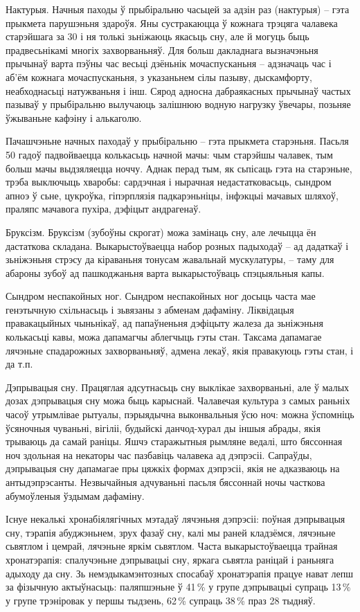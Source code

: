 Нактурыя. Начныя паходы ў прыбіральню часьцей за адзін раз (нактурыя) – гэта прыкмета парушэньня здароўя. Яны сустракаюцца ў кожнага трэцяга чалавека старэйшага за 30 і ня толькі зьніжаюць якасьць сну, але й могуць быць прадвесьнікамі многіх захворваньняў. Для больш дакладнага вызначэньня прычынаў варта пэўны час весьці дзёньнік мочаспусканьня – адзначаць час і аб'ём кожнага мочаспусканьня, з указаньнем сілы пазыву, дыскамфорту, неабходнасьці натужваньня і інш. Сярод адносна дабраякасных прычынаў частых пазываў у прыбіральню вылучаюць залішнюю водную нагрузку ўвечары, позьняе ўжываньне кафэіну і алькаголю.

Пачашчэньне начных паходаў у прыбіральню – гэта прыкмета старэньня. Пасьля 50 гадоў падвойваецца колькасьць начной мачы: чым старэйшы чалавек, тым больш мачы выдзяляецца ноччу. Аднак перад тым, як сьпісаць гэта на старэньне, трэба выключыць хваробы: сардэчная і нырачная недастатковасьць, сындром апноэ ў сьне, цукроўка, гіпэрплязія падкарэньніцы, інфэкцыі мачавых шляхоў, праляпс мачавога пухіра, дэфіцыт андрагенаў.

Бруксізм. Бруксізм (зубоўны скрогат) можа замінаць сну, але лечыцца ён дастаткова складана. Выкарыстоўваецца набор розных падыходаў – ад дадаткаў і зьніжэньня стрэсу да кіраваньня тонусам жавальнай мускулатуры, – таму для абароны зубоў ад пашкоджаньня варта выкарыстоўваць спэцыяльныя капы. 

Сындром неспакойных ног. Сындром неспакойных ног досыць часта мае генэтычную схільнасьць і зьвязаны з абменам дафаміну. Ліквідацыя правакацыйных чыньнікаў, ад папаўненьня дэфіцыту жалеза да зьніжэньня колькасьці кавы, можа дапамагчы аблегчыць гэты стан. Таксама дапамагае лячэньне спадарожных захворваньняў, адмена лекаў, якія правакуюць гэты стан, і да т.п.

Дэпрывацыя сну. Працяглая адсутнасьць сну выклікае захворваньні, але ў малых дозах дэпрывацыя сну можа быць карыснай. Чалавечая культура з самых раньніх часоў утрымлівае рытуалы, пэрыядычна выконвальныя ўсю ноч: можна ўспомніць ўсяночныя чуваньні, вігіліі, будыйскі данчод-хурал ды іншыя абрады, якія трываюць да самай раніцы. Яшчэ старажытныя рымляне ведалі, што бяссонная ноч здольная на некаторы час пазбавіць чалавека ад дэпрэсіі. Сапраўды, дэпрывацыя сну дапамагае пры цяжкіх формах дэпрэсіі, якія не адказваюць на антыдэпрэсанты. Незвычайныя адчуваньні пасьля бяссоннай ночы часткова абумоўленыя ўздымам дафаміну.

Існуе некалькі хронабіялягічных мэтадаў лячэньня дэпрэсіі: поўная дэпрывацыя сну, тэрапія абуджэньнем, зрух фазаў сну, калі мы раней кладзёмся, лячэньне сьвятлом і цемрай, лячэньне яркім сьвятлом. Часта выкарыстоўваецца трайная хронатэрапія: спалучэньне дэпрывацыі сну, яркага сьвятла раніцай і раньняга адыходу да сну. Зь немэдыкамэнтозных спосабаў хронатэрапія працуе нават лепш за фізычную актыўнасьць: паляпшэньне ў 41\,\% у групе дэпрывацыі супраць 13\,\% у групе трэніровак у першы тыдзень, 62\,\% супраць 38\,\% праз 28 тыдняў.

